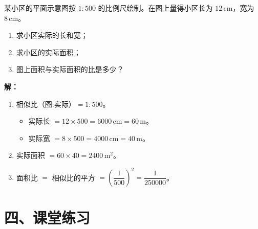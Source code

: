 \documentclass[12pt, a4paper]{ctexart}
\begin{document}
\begin{appbox}
某小区的平面示意图按 $1:500$ 的比例尺绘制。在图上量得小区长为 $12\,\text{cm}$，宽为 $8\,\text{cm}$。
\begin{enumerate}[nosep]
  \item 求小区实际的长和宽；
  \item 求小区的实际面积；
  \item 图上面积与实际面积的比是多少？
\end{enumerate}
\end{appbox}

\textbf{解：}
\begin{enumerate}
  \item 相似比（图:实际）$=1:500$。
  \begin{itemize}[nosep]
    \item 实际长 $=12\times500=6000\,\text{cm}=60\,\text{m}$。
    \item 实际宽 $=8\times500=4000\,\text{cm}=40\,\text{m}$。
  \end{itemize}
  \item 实际面积 $=60\times40=\boxed{2400}\,\text{m}^2$。
  \item 面积比 $=$ 相似比的平方 $=\left(\dfrac{1}{500}\right)^2=\dfrac{1}{250000}$。
\end{enumerate}

\section*{\textcolor{tipgreen}{四、课堂练习}}
\end{document}
